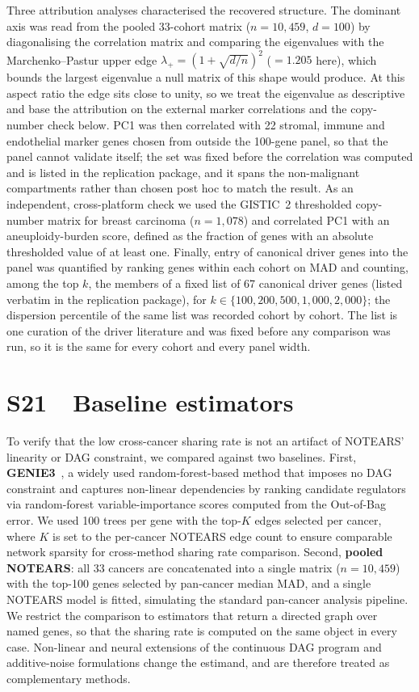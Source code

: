 \documentclass[11pt]{article}
\begin{document}
Three attribution analyses characterised the recovered structure. The dominant axis was read from the pooled 33-cohort matrix ($n = 10{,}459$, $d = 100$) by diagonalising the correlation matrix and comparing the eigenvalues with the Marchenko--Pastur upper edge $\lambda_+ = (1 + \sqrt{d/n})^2$ ($= 1.205$ here), which bounds the largest eigenvalue a null matrix of this shape would produce. At
this aspect ratio the edge sits close to unity, so we treat the eigenvalue as descriptive and
base the attribution on the external marker correlations and the copy-number check below. PC1 was then correlated with 22 stromal, immune and endothelial marker genes chosen from outside the 100-gene panel, so that the panel cannot validate itself; the set was fixed before the correlation was computed and is listed in the replication package, and it spans the non-malignant compartments rather than chosen post hoc to match the result. As an independent, cross-platform check we used the GISTIC~2 thresholded copy-number matrix for breast carcinoma ($n = 1{,}078$) and correlated PC1 with an aneuploidy-burden score, defined as the fraction of genes with an absolute thresholded value of at least one. Finally, entry of canonical driver genes into the panel was quantified by ranking genes within each cohort on MAD and counting, among the top $k$, the members of a fixed list of 67 canonical driver genes (listed verbatim in the replication package), for $k \in \{100, 200, 500, 1{,}000, 2{,}000\}$; the dispersion percentile of the same list was recorded cohort by cohort. The list is one curation of the driver literature and was fixed before any comparison was run, so it is the same for every cohort and every panel width.

\section*{S21\ \ Baseline estimators}

To verify that the low cross-cancer sharing rate is not an artifact of NOTEARS' linearity or DAG constraint, we compared against two baselines. First, \textbf{GENIE3}~\citep{huynh2010genie3}, a widely used random-forest-based method that imposes no DAG constraint and captures non-linear dependencies by ranking candidate regulators via random-forest variable-importance scores computed from the Out-of-Bag error. We used 100 trees per gene with the top-$K$ edges selected per cancer, where $K$ is set to the per-cancer NOTEARS edge count to ensure comparable network sparsity for cross-method sharing rate comparison. Second, \textbf{pooled NOTEARS}: all 33 cancers are concatenated into a single matrix ($n = 10{,}459$) with the top-100 genes selected by pan-cancer median MAD, and a single NOTEARS model is fitted, simulating the standard pan-cancer analysis pipeline. We restrict the comparison to estimators that return a directed graph over named genes, so that the sharing rate is computed on the same object in every case. Non-linear and neural extensions of the continuous DAG program \citep{zheng2020notearsmlp,lachapelle2020grandag,yu2019daggnn} and additive-noise formulations \citep{buhlmann2014cam} change the estimand, and are therefore treated as complementary methods.
\end{document}
